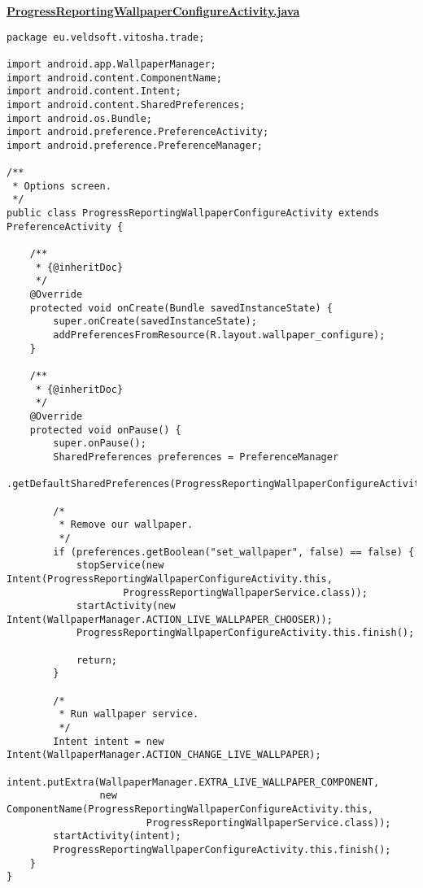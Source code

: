\textbf{\underline{ProgressReportingWallpaperConfigureActivity.java}}
\begin{verbatim}
package eu.veldsoft.vitosha.trade;

import android.app.WallpaperManager;
import android.content.ComponentName;
import android.content.Intent;
import android.content.SharedPreferences;
import android.os.Bundle;
import android.preference.PreferenceActivity;
import android.preference.PreferenceManager;

/**
 * Options screen.
 */
public class ProgressReportingWallpaperConfigureActivity extends PreferenceActivity {

    /**
     * {@inheritDoc}
     */
    @Override
    protected void onCreate(Bundle savedInstanceState) {
        super.onCreate(savedInstanceState);
        addPreferencesFromResource(R.layout.wallpaper_configure);
    }

    /**
     * {@inheritDoc}
     */
    @Override
    protected void onPause() {
        super.onPause();
        SharedPreferences preferences = PreferenceManager
                .getDefaultSharedPreferences(ProgressReportingWallpaperConfigureActivity.this);

        /*
         * Remove our wallpaper.
         */
        if (preferences.getBoolean("set_wallpaper", false) == false) {
            stopService(new Intent(ProgressReportingWallpaperConfigureActivity.this,
                    ProgressReportingWallpaperService.class));
            startActivity(new Intent(WallpaperManager.ACTION_LIVE_WALLPAPER_CHOOSER));
            ProgressReportingWallpaperConfigureActivity.this.finish();

            return;
        }

        /*
         * Run wallpaper service.
         */
        Intent intent = new Intent(WallpaperManager.ACTION_CHANGE_LIVE_WALLPAPER);
        intent.putExtra(WallpaperManager.EXTRA_LIVE_WALLPAPER_COMPONENT,
                new ComponentName(ProgressReportingWallpaperConfigureActivity.this,
                        ProgressReportingWallpaperService.class));
        startActivity(intent);
        ProgressReportingWallpaperConfigureActivity.this.finish();
    }
}
\end{verbatim}


